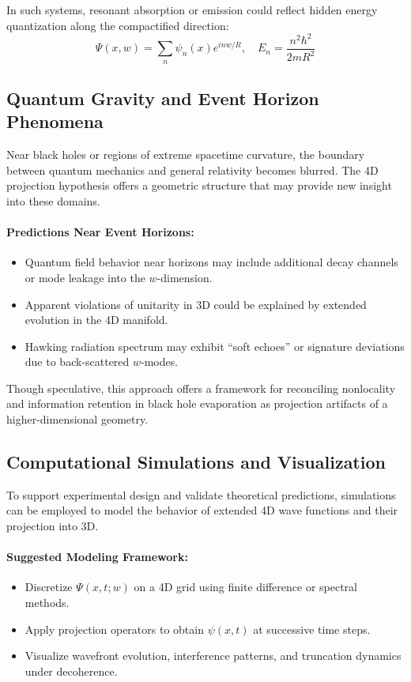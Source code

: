 \documentclass[12pt]{article}
\begin{document}
In such systems, resonant absorption or emission could reflect hidden energy quantization along the compactified direction:
\begin{equation}
\Psi(x, w) = \sum_n \psi_n(x) e^{inw/R}, \quad E_n = \frac{n^2 \hbar^2}{2mR^2}
\end{equation}

\subsection{Quantum Gravity and Event Horizon Phenomena}

Near black holes or regions of extreme spacetime curvature, the boundary between quantum mechanics and general relativity becomes blurred. The 4D projection hypothesis offers a geometric structure that may provide new insight into these domains.

\paragraph{Predictions Near Event Horizons:}
\begin{itemize}
    \item Quantum field behavior near horizons may include additional decay channels or mode leakage into the \( w \)-dimension.
    \item Apparent violations of unitarity in 3D could be explained by extended evolution in the 4D manifold.
    \item Hawking radiation spectrum may exhibit “soft echoes” or signature deviations due to back-scattered \( w \)-modes.
\end{itemize}

Though speculative, this approach offers a framework for reconciling nonlocality and information retention in black hole evaporation as projection artifacts of a higher-dimensional geometry.

\subsection{Computational Simulations and Visualization}

To support experimental design and validate theoretical predictions, simulations can be employed to model the behavior of extended 4D wave functions and their projection into 3D.

\paragraph{Suggested Modeling Framework:}
\begin{itemize}
    \item Discretize \( \Psi(x, t; w) \) on a 4D grid using finite difference or spectral methods.
    \item Apply projection operators to obtain \( \psi(x, t) \) at successive time steps.
    \item Visualize wavefront evolution, interference patterns, and truncation dynamics under decoherence.
\end{itemize}
\end{document}
